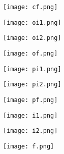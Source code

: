 \documentclass[]{article}
\begin{document}
	\begin{figure}[!htb]{
		\begin{center}
		\texttt{[image: cf.png]}
		\end{center}
	}\end{figure}
	

	\begin{figure}[!htb]{
		\begin{center}
		\texttt{[image: oi1.png]}
		\end{center}
	}\end{figure}

	\begin{figure}[!htb]{
		\begin{center}
		\texttt{[image: oi2.png]}
		\end{center}
	}\end{figure}
	
	\begin{figure}[!htb]{
		\begin{center}
		\texttt{[image: of.png]}
		\end{center}
	}\end{figure}

	\begin{figure}[!htb]{
		\begin{center}
		\texttt{[image: pi1.png]}
		\end{center}
	}\end{figure}

	\begin{figure}[!htb]{
		\begin{center}
		\texttt{[image: pi2.png]}
		\end{center}
	}\end{figure}
	
	\begin{figure}[!htb]{
		\begin{center}
		\texttt{[image: pf.png]}
		\end{center}
	}\end{figure}
	
	\begin{figure}[!htb]{
		\begin{center}
		\texttt{[image: i1.png]}
		\end{center}
	}\end{figure}

	\begin{figure}[!htb]{
		\begin{center}
		\texttt{[image: i2.png]}
		\end{center}
	}\end{figure}
	
	\begin{figure}[!htb]{
		\begin{center}
		\texttt{[image: f.png]}
		\end{center}
	}\end{figure}

	
\end{document}
